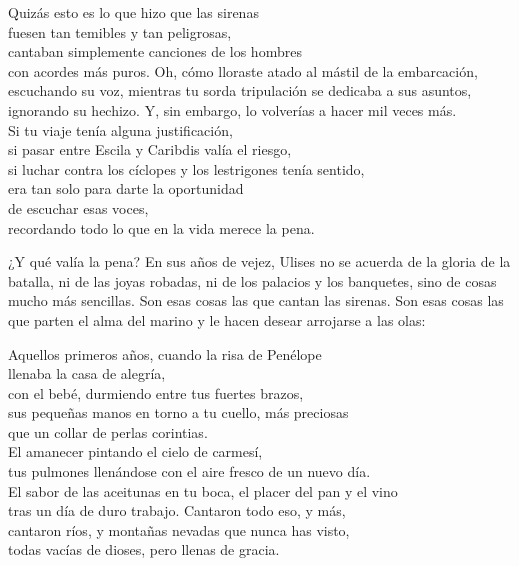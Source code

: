 \begin{versopropio}
Quizás esto es lo que hizo que las sirenas\\
fuesen tan temibles y tan peligrosas,\\
cantaban simplemente canciones de los hombres\\
con acordes más puros.
\stanzabreak
Oh, cómo lloraste atado al mástil de la embarcación,\\
escuchando su voz, mientras tu sorda tripulación se dedicaba a sus asuntos,\\
ignorando su hechizo. Y, sin embargo, lo volverías a hacer mil veces más.\\
Si tu viaje tenía alguna justificación,\\
si pasar entre Escila y Caribdis valía el riesgo,\\
si luchar contra los cíclopes y los lestrigones tenía sentido,\\
era tan solo para darte la oportunidad\\
de escuchar esas voces,\\
recordando todo lo que en la vida merece la pena.
\end{versopropio}

¿Y qué valía la pena? En sus años de vejez, Ulises no se acuerda de la gloria de la batalla, ni de las joyas robadas, ni de los palacios y los banquetes, sino de cosas mucho más sencillas. Son esas cosas las que cantan las sirenas. Son esas cosas las que parten el alma del marino y le hacen desear arrojarse a las olas:

\begin{versopropio}
Aquellos primeros años, cuando la risa de Penélope\\
llenaba la casa de alegría,\\
con el bebé, durmiendo entre tus fuertes brazos,\\
sus pequeñas manos en torno a tu cuello, más preciosas\\
que un collar de perlas corintias.\\
El amanecer pintando el cielo de carmesí,\\
tus pulmones llenándose con el aire fresco de un nuevo día.\\
El sabor de las aceitunas en tu boca, el placer del pan y el vino\\
tras un día de duro trabajo. Cantaron todo eso, y más,\\
cantaron ríos, y montañas nevadas que nunca has visto,\\
todas vacías de dioses, pero llenas de gracia.
\end{versopropio}

